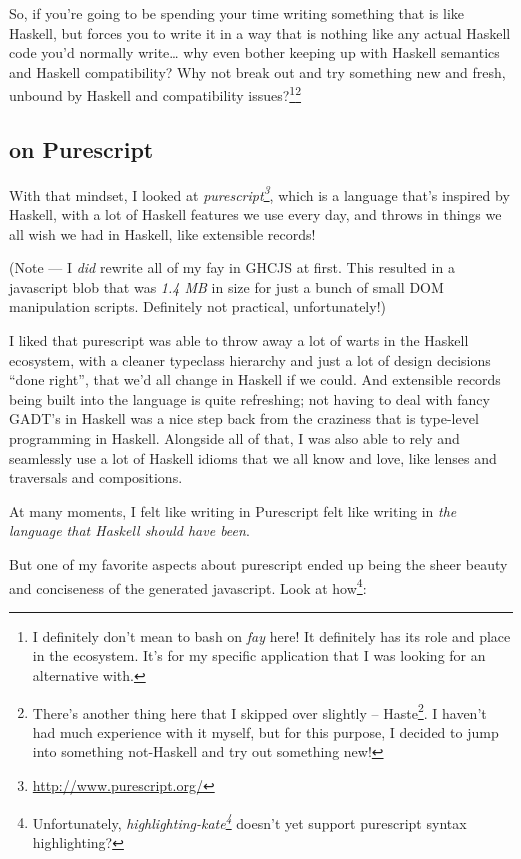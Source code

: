 \documentclass[]{article}
\renewcommand{\href}[2]{#2\footnote{\url{#1}}}
\begin{document}
So, if you're going to be spending your time writing something that is like
Haskell, but forces you to write it in a way that is nothing like any actual
Haskell code you'd normally write\ldots{} why even bother keeping up with
Haskell semantics and Haskell compatibility? Why not break out and try something
new and fresh, unbound by Haskell and compatibility issues?\footnote{I
  definitely don't mean to bash on \emph{fay} here! It definitely has its role
  and place in the ecosystem. It's for my specific application that I was
  looking for an alternative with.}\footnote{There's another thing here that I
  skipped over slightly -- \href{http://haste-lang.org/}{Haste}. I haven't had
  much experience with it myself, but for this purpose, I decided to jump into
  something not-Haskell and try out something new!}

\hypertarget{on-purescript}{%
\subsection{on Purescript}\label{on-purescript}}

With that mindset, I looked at
\emph{\href{http://www.purescript.org/}{purescript}}, which is a language that's
inspired by Haskell, with a lot of Haskell features we use every day, and throws
in things we all wish we had in Haskell, like extensible records!

(Note --- I \emph{did} rewrite all of my fay in GHCJS at first. This resulted in
a javascript blob that was \emph{1.4 MB} in size for just a bunch of small DOM
manipulation scripts. Definitely not practical, unfortunately!)

I liked that purescript was able to throw away a lot of warts in the Haskell
ecosystem, with a cleaner typeclass hierarchy and just a lot of design decisions
``done right'', that we'd all change in Haskell if we could. And extensible
records being built into the language is quite refreshing; not having to deal
with fancy GADT's in Haskell was a nice step back from the craziness that is
type-level programming in Haskell. Alongside all of that, I was also able to
rely and seamlessly use a lot of Haskell idioms that we all know and love, like
lenses and traversals and compositions.

At many moments, I felt like writing in Purescript felt like writing in
\emph{the language that Haskell should have been}.

But one of my favorite aspects about purescript ended up being the sheer beauty
and conciseness of the generated javascript. Look at how\footnote{Unfortunately,
  \emph{\href{https://github.com/jgm/highlighting-kate}{highlighting-kate}}
  doesn't yet support purescript syntax highlighting?}:
\end{document}
